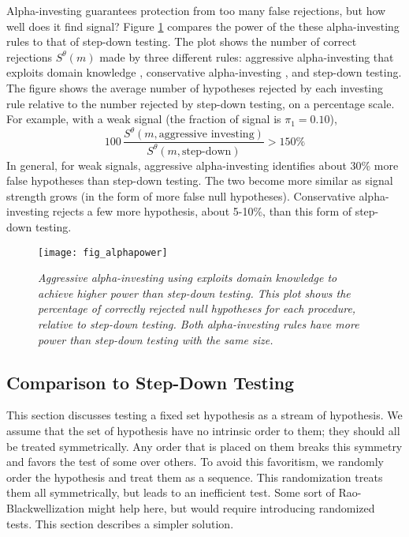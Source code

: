 \documentclass[12pt]{article}
\newcommand{\dpf}[1]{\noindent{\textcolor{blue}{\{{\bf dpf:} \em
#1\}}}}
\begin{document}
Alpha-investing guarantees protection from too many false rejections,
but how well does it find signal?  Figure \ref{fi:alphapower} compares
the power of the these alpha-investing rules to that of step-down
testing.  The plot shows the number of correct rejections
$S^\theta(m)$ made by three different rules: aggressive
alpha-investing that exploits domain knowledge 
, conservative alpha-investing , and step-down testing.  The figure shows the average
number of hypotheses rejected by each investing rule relative to the
number rejected by step-down testing, on a percentage scale.  For
example, with a weak signal (the fraction of signal is $\pi_1 = 0.10$),
\begin{displaymath}
 100 \,\frac{S^\theta(m,\mbox{aggressive investing})}
            {S^\theta(m,\mbox{step-down})} > 150 \%
\end{displaymath}
In general, for weak signals, aggressive alpha-investing identifies
about 30\% more false hypotheses than step-down testing. The two
become more similar as signal strength grows (in the form of more
false null hypotheses).  Conservative alpha-investing rejects a few more hypothesis, about 5-10\%, than this form of step-down testing.

\begin{figure}
\caption{\label{fi:alphapower} \sl
Aggressive alpha-investing using  exploits domain
knowledge to achieve higher power than step-down testing.
This plot shows the percentage of correctly rejected null hypotheses
for each procedure, relative to step-down testing.  Both
alpha-investing rules have more power than step-down testing with the
same size.  \dpf{should this be controls FWER in the weak sense?} }

\vspace*{0.05in} 
\centerline{
            \texttt{[image: fig\_alphapower]} 
           }
\end{figure}


\subsection{Comparison to Step-Down Testing}

This section discusses testing a fixed set hypothesis as a
 stream of hypothesis.  We assume that the set of hypothesis have
 no intrinsic order to them; they should all be treated symmetrically.
 Any order that is placed on them breaks this symmetry and
 favors the test of some over others.  To avoid this favoritism, we randomly order
 the hypothesis and treat them as a sequence.  This randomization
 treats them all symmetrically, but leads to an inefficient test.  Some sort of
 Rao-Blackwellization might help here, but would require
 introducing randomized tests.  This section describes a simpler solution.
\end{document}
